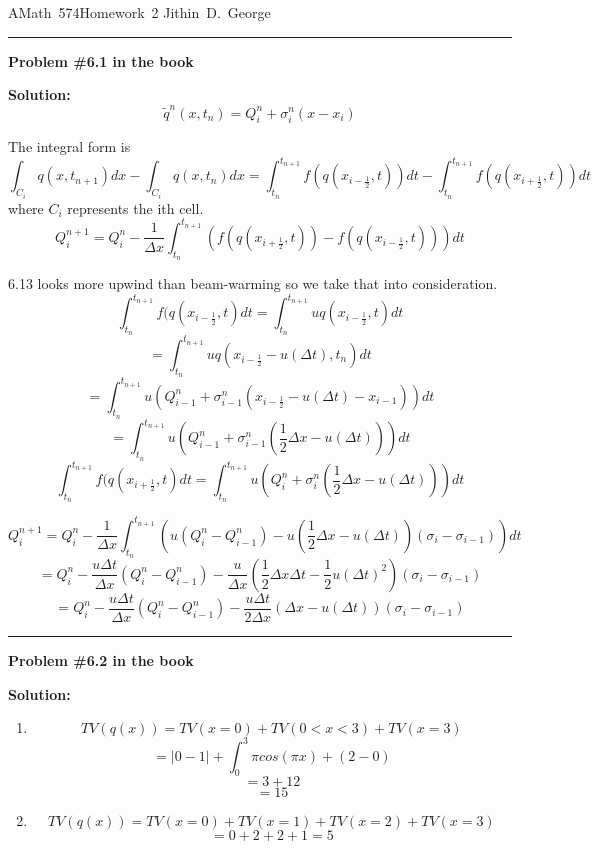 \documentclass[11pt]{article}
\begin{document}
\hfill\vbox{\hbox{AMath 574}\hbox{Homework 2}
\hbox{Jithin D. George}}




\vskip 1cm
\hrule
{\bf Problem \#6.1 in the book}


\vskip 1cm
{\bf Solution:}
\[\tilde{q}^n(x,t_n)= Q_i^n +\sigma_i^n(x-x_i)\]

The integral form is 
\[ \int_{C_i}q(x,t_{n+1}) dx- \int_{C_i}q(x,t_{n})dx=\int_{t_n}^{t_{n+1}}f(q(x_{i-\frac{1}{2}},t))dt- \int_{t_n}^{t_{n+1}}f(q(x_{i+\frac{1}{2}},t))dt\]
where $C_i$ represents the ith cell.
\[Q_i^{n+1}= Q_i^{n}- \frac{1}{\Delta x}\int_{t_n}^{t_{n+1}}(f(q(x_{i+\frac{1}{2}},t))-f(q(x_{i-\frac{1}{2}},t)))dt  \]

6.13 looks more upwind than beam-warming so we take that into consideration.
\[\int_{t_n}^{t_{n+1}}f(q(x_{i-\frac{1}{2}},t)dt= \int_{t_n}^{t_{n+1}}u q(x_{i-\frac{1}{2}},t)dt \]
\[= \int_{t_n}^{t_{n+1}}u q(x_{i-\frac{1}{2}}-u(\Delta t),t_n)dt \]
\[= \int_{t_n}^{t_{n+1}}u ( Q_{i-1}^n +\sigma_{i-1}^n(x_{i-\frac{1}{2}}-u(\Delta t)-x_{i-1}))dt \]
\[= \int_{t_n}^{t_{n+1}}u ( Q_{i-1}^n +\sigma_{i-1}^n(\frac{1}{2}\Delta x-u(\Delta t)))dt \]
\[\int_{t_n}^{t_{n+1}}f(q(x_{i+\frac{1}{2}},t)dt= \int_{t_n}^{t_{n+1}}u ( Q_{i}^n +\sigma_{i}^n(\frac{1}{2}\Delta x-u(\Delta t)))dt \]

\[Q_i^{n+1}= Q_i^{n}- \frac{1}{\Delta x}\int_{t_n}^{t_{n+1}}(u ( Q_{i}^n-Q_{i-1}^n) -u(\frac{1}{2}\Delta x-u(\Delta t))(\sigma_{i}-\sigma_{i-1}))dt  \]
\[= Q_i^{n}- \frac{u\Delta t}{\Delta x} ( Q_{i}^n-Q_{i-1}^n) - \frac{u}{\Delta x}(\frac{1}{2}\Delta x\Delta t-\frac{1}{2}u(\Delta t)^2)(\sigma_{i}-\sigma_{i-1})  \]
\[= Q_i^{n}- \frac{u\Delta t}{\Delta x} ( Q_{i}^n-Q_{i-1}^n) - \frac{u\Delta t}{2\Delta x}(\Delta x-u(\Delta t))(\sigma_{i}-\sigma_{i-1})  \]
\vskip 1cm
\hrule
{\bf Problem \#6.2 in the book}


\vskip 1cm
{\bf Solution:}
\begin{enumerate}
	\item
	\[TV(q(x))= TV(x=0)+ TV(0<x<3)+TV(x=3)\]
	\[= |0-1|+ \int_{0}^{3}\pi cos(\pi x)+(2-0)\]
	\[= 3+ 12\]
	\[= 15\]
	\item
		\[TV(q(x))= TV(x=0)+ TV(x=1)+TV(x=2)+TV(x=3)\]
		\[= 0+ 2+2+1=5\]
\end{enumerate}
\end{document}
